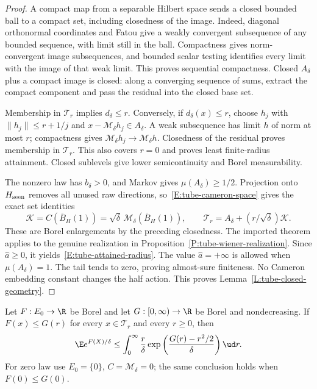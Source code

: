 \begin{proof}
  A compact map from a separable Hilbert space sends a closed bounded
  ball to a compact set, including closedness of the image.
  Indeed, diagonal orthonormal coordinates and Fatou give a weakly
  convergent subsequence of any bounded sequence, with limit still
  in the ball. Compactness gives norm-convergent image subsequences,
  and bounded scalar testing identifies every limit with the image
  of that weak limit. This proves sequential compactness.
  Closed $A_\delta$ plus a compact image is closed: along a converging
  sequence of sums, extract the compact component and pass the
  residual into the closed base set.

  Membership in $\mathcal T_r$ implies $d_\delta\le r$.
  Conversely, if $d_\delta(x)\le r$, choose $h_j$ with
  $\|h_j\|\le r+1/j$ and $x-\mathcal M_\delta h_j\in A_\delta$.
  A weak subsequence has limit $h$ of norm at most $r$;
  compactness gives $\mathcal M_\delta h_j\to\mathcal M_\delta h$.
  Closedness of the residual proves membership in $\mathcal T_r$.
  This also covers $r=0$ and proves least finite-radius attainment.
  Closed sublevels give lower semicontinuity and Borel measurability.

  The nonzero law has $b_\delta>0$, and Markov gives
  $\mu(A_\delta)\ge1/2$.
  Projection onto $H_{\rm seen}$ removes all unused raw directions,
  so~\eqref{E:tube-cameron-space} gives the exact set identities
  \[
    \mathcal K=C(\overline B_H(1))
    =\sqrt\delta\,\mathcal M_\delta(\overline B_H(1)),\qquad
    \mathcal T_r=A_\delta+(r/\sqrt\delta)\mathcal K .
  \]
  These are Borel enlargements by the preceding closedness.
  The imported theorem applies to the genuine realization in
  Proposition~\ref{P:tube-wiener-realization}.
  Since $\widehat a\ge0$, it yields~\eqref{E:tube-attained-radius}.
  The value $\widehat a=+\infty$ is allowed when $\mu(A_\delta)=1$.
  The tail tends to zero, proving almost-sure finiteness.
  No Cameron embedding constant changes the half action.
  This proves Lemma~\ref{L:tube-closed-geometry}.
\end{proof}

\begin{proposition}
  \label{P:tube-rayleigh-transfer}
  Let $F:E_0\to\R$ be Borel and let $G:[0,\infty)\to\R$
  be Borel and nondecreasing.
  If $F(x)\le G(r)$ for every $x\in\mathcal T_r$ and every $r\ge0$,
  then
  \begin{equation}\label{E:tube-rayleigh-transfer}
    \E e^{F(X)/\delta}
    \le\int_0^\infty\frac r\delta
    \exp\left(\frac{G(r)-r^2/2}{\delta}\right)\ud r .
  \end{equation}
  For zero law use $E_0=\{0\}$, $C=\mathcal M_\delta=0$;
  the same conclusion holds when $F(0)\le G(0)$.
\end{proposition}

